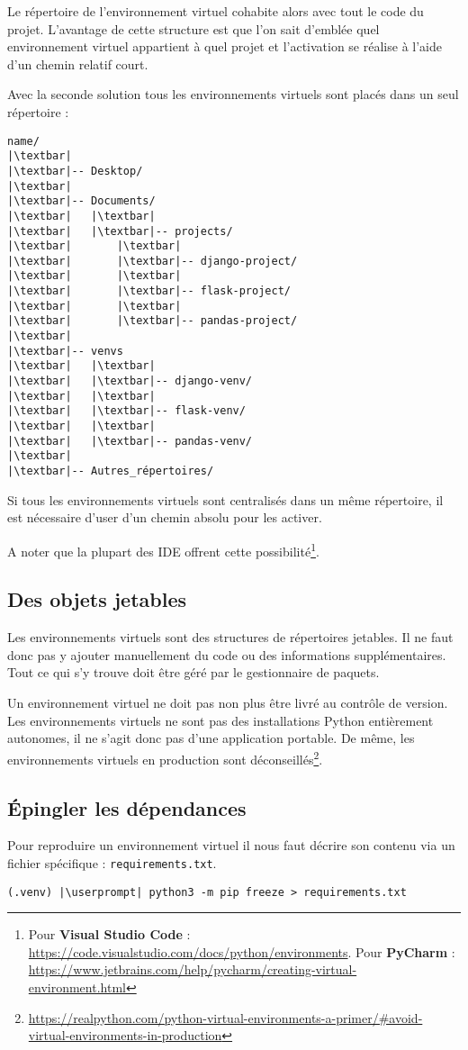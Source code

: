 Le répertoire de l'environnement virtuel cohabite alors avec tout le code du projet. L'avantage de cette structure est que l'on sait d'emblée quel environnement virtuel appartient à quel projet et l'activation se réalise à l'aide d'un chemin relatif court.

Avec la seconde solution tous les environnements virtuels sont placés dans un seul répertoire :
\begin{lstlisting}[style=tree]
name/
|\textbar|
|\textbar|-- Desktop/
|\textbar|
|\textbar|-- Documents/
|\textbar|   |\textbar|
|\textbar|   |\textbar|-- projects/
|\textbar|       |\textbar|
|\textbar|       |\textbar|-- django-project/
|\textbar|       |\textbar|
|\textbar|       |\textbar|-- flask-project/
|\textbar|       |\textbar|
|\textbar|       |\textbar|-- pandas-project/
|\textbar|
|\textbar|-- venvs
|\textbar|   |\textbar|
|\textbar|   |\textbar|-- django-venv/
|\textbar|   |\textbar|
|\textbar|   |\textbar|-- flask-venv/
|\textbar|   |\textbar|
|\textbar|   |\textbar|-- pandas-venv/
|\textbar|
|\textbar|-- Autres_répertoires/
\end{lstlisting}

Si tous les environnements virtuels  sont centralisés dans un même répertoire, il est nécessaire d'user d'un chemin absolu pour les activer.

A noter que la plupart des IDE offrent cette possibilité\footnote{Pour \textbf{Visual Studio Code} : \url{https://code.visualstudio.com/docs/python/environments}. Pour \textbf{PyCharm} : \url{https://www.jetbrains.com/help/pycharm/creating-virtual-environment.html}}.

\subsection*{Des objets jetables}
Les environnements virtuels sont des structures de répertoires jetables. Il ne faut donc pas y ajouter manuellement du code ou des informations supplémentaires. Tout ce qui s'y trouve doit être géré par le gestionnaire de paquets.

Un environnement virtuel ne doit pas non plus être livré au contrôle de version. Les environnements virtuels ne sont pas des installations Python entièrement autonomes, il ne s'agit donc pas d'une application portable. De même, les environnements virtuels en production sont déconseillés\footnote{\url{https://realpython.com/python-virtual-environments-a-primer/\#avoid-virtual-environments-in-production}}.

\subsection*{Épingler les dépendances}
Pour reproduire un environnement virtuel  il nous faut décrire son contenu via un fichier spécifique : \texttt{requirements.txt}.
\begin{lstlisting}[style=bash]
(.venv) |\userprompt| python3 -m pip freeze > requirements.txt
\end{lstlisting}


